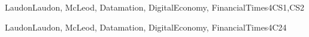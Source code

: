\begin{syllabus}
\begin{unit}{\SPIntellectualProperty}{}{LaudonLaudon, McLeod, Datamation, DigitalEconomy, FinancialTimes}{4}{CS1,CS2}
	\begin{learningoutcomes}%
        \item \SPIntellectualPropertyLODiscussTheOf [\Assessment]
        \item \SPIntellectualPropertyLODiscussTheTheOf [\Familiarity]
        \item \SPIntellectualPropertyLODescribeLegislation [\Assessment]
        \item \SPIntellectualPropertyLOCritiqueLegislation [\Familiarity]
        \item \SPIntellectualPropertyLOIdentifyContemporary [\Assessment]
        \item \SPIntellectualPropertyLOJustify [\Assessment] [\Familiarity]
        \item \SPIntellectualPropertyLOEvaluateTheInherent [\Familiarity]
        \item \SPIntellectualPropertyLOInterpretTheImplementation [\Familiarity]
        \item \SPIntellectualPropertyLODiscussTheInPatents [\Familiarity]
        \item \SPIntellectualPropertyLOCharacterizeAndConcepts [\Familiarity]
        \item \SPIntellectualPropertyLOIdentifyTheTheMovement [\Assessment]
        \item \SPIntellectualPropertyLOIdentifyTheOf [\Familiarity]
	\end{learningoutcomes}
\end{unit}

\begin{unit}{\SPPrivacyandCivilLiberties}{}{LaudonLaudon, McLeod, Datamation, DigitalEconomy, FinancialTimes}{4}{C24}
	\begin{topics}
        \item \SPPrivacyandCivilLibertiesTopicPhilosophicalFoundations
        \item \SPPrivacyandCivilLibertiesTopicLegalFoundations
        \item \SPPrivacyandCivilLibertiesTopicPrivacy
        \item \SPPrivacyandCivilLibertiesTopicRamifications
        \item \SPPrivacyandCivilLibertiesTopicTechnology
        \item \SPPrivacyandCivilLibertiesTopicPrivacyLegislation
        \item \SPPrivacyandCivilLibertiesTopicCivil
        \item \SPPrivacyandCivilLibertiesTopicFreedom
	\end{topics}


\end{unit}
\end{syllabus}
